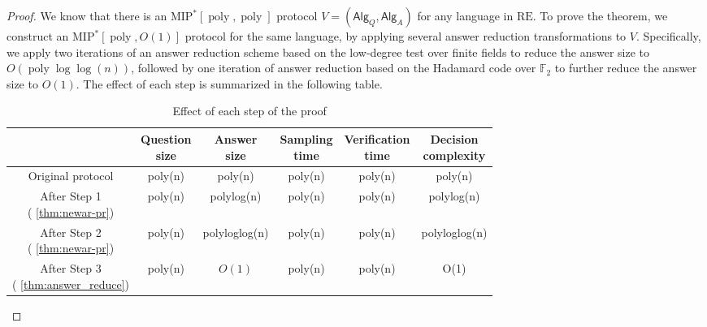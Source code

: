 \documentclass[10pt,a4paper]{article}
\theoremstyle{plain}
\theoremstyle{definition}
\newcommand{\poly} {\ensuremath{\operatorname{poly}}}
\newcommand{\1}{\mathbb{1}} %
\newcommand{\bF}{\mathbb{F}}
\newcommand{\Alg}{\mathsf{Alg}}
\newcommand{\MIP}{\mathrm{MIP}}
\newcommand{\RE}{\mathrm{RE}}
\begin{document}
\begin{proof}
    We know that there is an $\MIP^\ast[\poly,\poly]$ protocol $V = (\Alg_Q, \Alg_A)$ for any language in $\RE$. To prove the theorem, we construct an $\MIP^\ast[\poly, O(1)]$ protocol for the same language, by applying several answer reduction transformations to $V$. Specifically, we apply two iterations of an answer reduction scheme based on the low-degree test over finite fields to reduce the answer size to $O(\poly\log\log(n))$, followed by one iteration of answer reduction based on the Hadamard code over $\bF_2$ to further reduce the answer size to $O(1)$. The effect of each step is summarized in the following table.
    \begin{table}[h!]
\centering
\begin{tabular}{|c||c|c|c|c|c|}
\hline
 & \makecell{\textbf{Question} \\\textbf{size}} & \makecell{\textbf{Answer}\\ \textbf{size}} & \makecell{\textbf{Sampling}\\ \textbf{time}} & \makecell{\textbf{Verification}\\\textbf{time}} & \makecell{\textbf{Decision}\\\textbf{ complexity}}\\ \hline
Original protocol      & poly(n)      & poly(n)      & poly(n) & poly(n) & poly(n)\\ \hline
\makecell{After Step 1 \\ ( \cref{thm:newar-pr})}     & poly(n)     & polylog(n)   & poly(n)&   poly(n) & polylog(n) \\ \hline
\makecell{After Step 2\\ ( \cref{thm:newar-pr})}     & poly(n)     & polyloglog(n)   & poly(n)&   poly(n) & polyloglog(n) \\ \hline
\makecell{After Step 3 \\ ( \cref{thm:answer_reduce})}     & poly(n)     & $O(1)$   & poly(n)&   poly(n) & O(1) \\ \hline
\end{tabular}
\caption{Effect of each step of the proof}
\label{tab:sample}
\end{table}


\end{proof}
\end{document}
